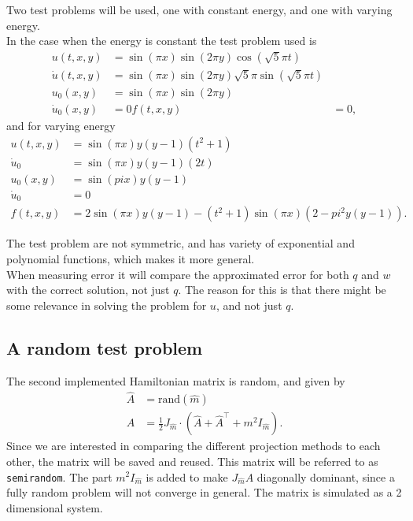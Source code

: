 Two test problems will be used, one with constant energy, and one with varying energy. \\

In the case when the energy is constant the test problem used is 
\begin{equation}
\begin{aligned}
u(t,x,y) &= \sin(\pi x) \sin( 2 \pi y) \cos(\sqrt{5} \pi t) \\
\dot{u} (t,x,y) &= \sin(\pi x) \sin( 2 \pi y) \sqrt{5} \pi \sin(\sqrt{5} \pi t) \\
u_0(x,y) &= \sin( \pi x) \sin(2 \pi y) \\
\dot{u}_0(x,y) & = 0
f(t,x,y) &= 0 ,
\end{aligned}
\end{equation}
and for varying energy
\begin{equation}
\begin{aligned}
u(t,x,y) &= \sin(\pi x) y (y-1) (t^2+1) \\
\dot{u}_0 &= \sin(\pi x) y (y-1) (2 t) \\
u_0(x,y) &= \sin(pi x) y (y-1) \\
\dot{u}_0& = 0 \\
f(t,x,y) & = 2  \sin(\pi x) y (y-1) -(t^2+1) \sin(\pi x) (2-pi^2 y (y-1)).
\end{aligned}
\end{equation}

The test problem are not symmetric, and has variety of exponential and polynomial functions, which makes it more general. \\

When measuring error it will compare the approximated error for both $q$ and $w$ with the correct solution, not just $q$. The reason for this is that there might be some relevance in solving the problem for $u$, and not just $q$. 

\subsection{A random test problem} %
The second implemented Hamiltonian matrix is random, and given by
\begin{equation}
\begin{aligned}
\hat{A} &= \text{rand}(\hat{m}) \\
A &= \frac{1}{2} J_{\hat{m}} \cdot (\hat{A} + \hat{A}^\top + m^2 I_{\hat{m}}).
\end{aligned}
\end{equation}
Since we are interested in comparing the different projection methods to each other, the matrix will be saved and reused. This matrix will be referred to as \texttt{semirandom}. The part $m^2 I_{\hat{m}} $ is added to make $J_{\hat{m}}A$ diagonally dominant, since a fully random problem will not converge in general. The matrix is simulated as a 2 dimensional system. 



